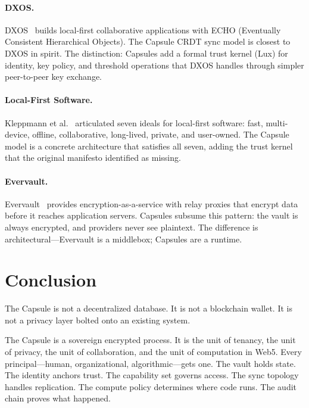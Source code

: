 \documentclass[11pt,a4paper]{article}
\begin{document}
\paragraph{DXOS.}
DXOS~\cite{dxos2023} builds local-first collaborative applications with ECHO
(Eventually Consistent Hierarchical Objects). The Capsule CRDT sync model is
closest to DXOS in spirit. The distinction: Capsules add a formal trust kernel
(Lux) for identity, key policy, and threshold operations that DXOS handles
through simpler peer-to-peer key exchange.

\paragraph{Local-First Software.}
Kleppmann et al.~\cite{kleppmann2019} articulated seven ideals for local-first
software: fast, multi-device, offline, collaborative, long-lived, private,
and user-owned. The Capsule model is a concrete architecture that satisfies
all seven, adding the trust kernel that the original manifesto identified
as missing.

\paragraph{Evervault.}
Evervault~\cite{evervault2022} provides encryption-as-a-service with relay
proxies that encrypt data before it reaches application servers. Capsules
subsume this pattern: the vault is always encrypted, and providers never see
plaintext. The difference is architectural---Evervault is a middlebox;
Capsules are a runtime.

\section{Conclusion}\label{sec:conclusion}

The Capsule is not a decentralized database. It is not a blockchain wallet.
It is not a privacy layer bolted onto an existing system.

The Capsule is a sovereign encrypted process. It is the unit of tenancy, the
unit of privacy, the unit of collaboration, and the unit of computation in
Web5. Every principal---human, organizational, algorithmic---gets one. The
vault holds state. The identity anchors trust. The capability set governs
access. The sync topology handles replication. The compute policy determines
where code runs. The audit chain proves what happened.
\end{document}
